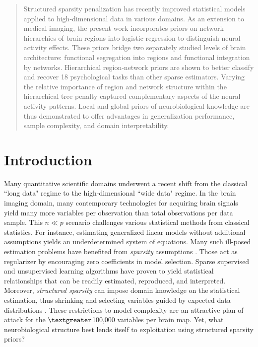 \documentclass[runningheads,a4paper]{llncs}
\begin{document}
\maketitle


\begin{abstract}
    Structured sparsity penalization has recently improved
    statistical models applied to high-dimensional data in various domains.
    As an extension to medical imaging,
    the present work incorporates
    priors on network hierarchies of brain regions into
    logistic-regression to distinguish neural activity effects.
    These priors bridge two separately studied levels
    of brain architecture:
    functional segregation into regions and
    functional integration by networks.
    Hierarchical region-network priors are shown to better classify
    and recover 
    18 psychological tasks than other sparse estimators.
    Varying the relative importance of
    region and network structure within the hierarchical tree penalty
    captured complementary aspects of the neural activity patterns.
    Local and global priors of neurobiological knowledge
    are thus demonstrated to offer advantages in
    generalization performance, sample complexity,
    and domain interpretability.
\end{abstract}


\section{Introduction}
Many quantitative scientific domains underwent a
recent shift from the classical ``long data" regime to
the high-dimensional ``wide data" regime.
In the brain imaging domain,
many contemporary technologies for acquiring brain signals yield many
more variables per observation than
total observations per data sample.
This $n \ll p$ scenario challenges various statistical methods from
classical statistics.
For instance,
estimating generalized linear models without additional assumptions
yields an underdetermined system of equations.
%
Many such ill-posed estimation problems
have benefited from
\textit{sparsity} assumptions
\cite{bach2012optimization}.
Those act as regularizer by encouraging zero coefficients
in model selection.
Sparse supervised and unsupervised
learning algorithms have proven to yield
statistical relationships that can be readily
estimated, reproduced, and interpreted.
%
Moreover, \textit{structured sparsity} can impose
domain knowledge on the 
statistical estimation,
thus shrinking and selecting variables guided by
expected data distributions
\cite{bach2012optimization}.
These restrictions to model complexity
are an attractive plan of attack
for the $\textgreater$100,000 variables per brain map.
Yet, what neurobiological structure best lends itself
to exploitation using structured sparsity priors?
\end{document}
